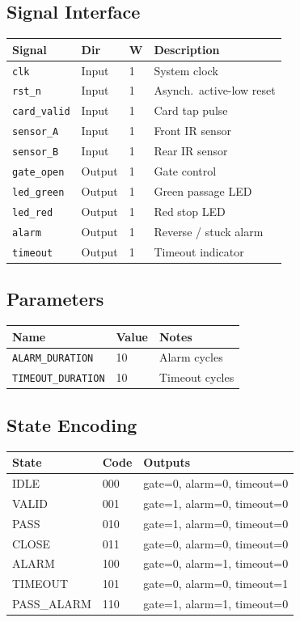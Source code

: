 \documentclass[12pt,a4paper]{ctexart}
\begin{document}
\subsection*{Signal Interface}
\begin{tabular}{llll}
\toprule
\textbf{Signal} & \textbf{Dir} & \textbf{W} & \textbf{Description} \\
\midrule
\texttt{clk}       & Input  & 1 & System clock \\
\texttt{rst\_n}    & Input  & 1 & Asynch.\ active-low reset \\
\texttt{card\_valid} & Input  & 1 & Card tap pulse \\
\texttt{sensor\_A} & Input  & 1 & Front IR sensor \\
\texttt{sensor\_B} & Input  & 1 & Rear IR sensor \\
\texttt{gate\_open} & Output & 1 & Gate control \\
\texttt{led\_green} & Output & 1 & Green passage LED \\
\texttt{led\_red}   & Output & 1 & Red stop LED \\
\texttt{alarm}     & Output & 1 & Reverse / stuck alarm \\
\texttt{timeout}   & Output & 1 & Timeout indicator \\
\bottomrule
\end{tabular}

\subsection*{Parameters}
\begin{tabular}{lll}
\toprule
\textbf{Name} & \textbf{Value} & \textbf{Notes} \\
\midrule
\texttt{ALARM\_DURATION}  & 10 & Alarm cycles \\
\texttt{TIMEOUT\_DURATION} & 10 & Timeout cycles \\
\bottomrule
\end{tabular}

\subsection*{State Encoding}
\begin{tabular}{lll}
\toprule
\textbf{State} & \textbf{Code} & \textbf{Outputs} \\
\midrule
IDLE       & 000 & gate=0, alarm=0, timeout=0 \\
VALID      & 001 & gate=1, alarm=0, timeout=0 \\
PASS       & 010 & gate=1, alarm=0, timeout=0 \\
CLOSE      & 011 & gate=0, alarm=0, timeout=0 \\
ALARM      & 100 & gate=0, alarm=1, timeout=0 \\
TIMEOUT    & 101 & gate=0, alarm=0, timeout=1 \\
PASS\_ALARM & 110 & gate=1, alarm=1, timeout=0 \\
\bottomrule
\end{tabular}
\end{document}
